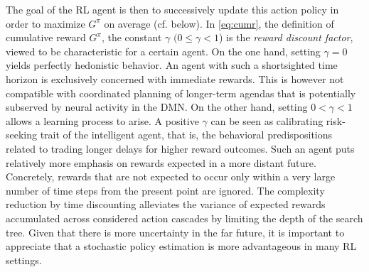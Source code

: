 \documentclass[10pt,letterpaper]{article}
\begin{document}
The goal of the RL agent is then to successively update this action policy in order
to maximize $G^\pi$ on average (cf. below). In \eqref{eq:cumr},
the definition of cumulative reward $G^\pi$,
the constant $\gamma$ $(0 \le \gamma < 1$) is the \textit{reward discount factor},
viewed to be characteristic for a certain agent.
On the one hand,
setting $\gamma = 0$ yields perfectly hedonistic behavior.
An agent with such a shortsighted time horizon is exclusively
concerned with immediate rewards.
This is however not compatible with coordinated planning of longer-term agendas that is
potentially subserved by neural activity in the DMN.
On the other hand,
setting $0 < \gamma < 1$ allows a learning process to arise.
A positive $\gamma$ can be seen as calibrating risk-seeking trait of the intelligent agent,
that is, the behavioral predispositions related to trading longer delays
for higher reward outcomes.
Such an agent puts relatively more emphasis on rewards expected in
a more distant future.
Concretely,
rewards that are not expected to occur only within
a very large number of
time steps from the present point are ignored.
The complexity reduction by time discounting
alleviates the variance of expected rewards accumulated across
considered action cascades by limiting the depth of the search tree.
Given that there is more uncertainty in the far future,
it is important to appreciate that a stochastic policy estimation
is more advantageous in many RL settings.
\end{document}
